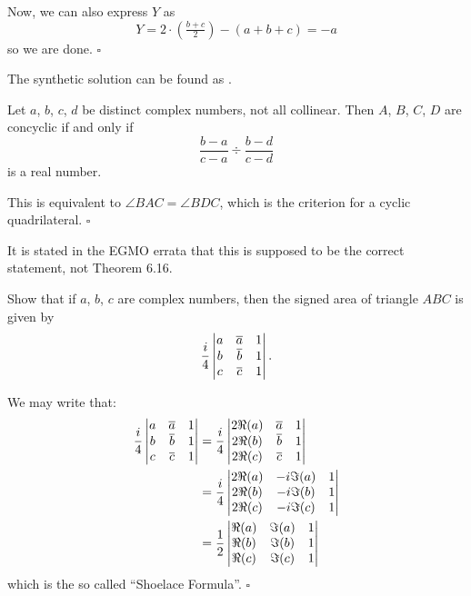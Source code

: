 \documentclass{article}
\begin{document}
Now, we can also express $Y$ as \[Y = 2\cdot(\tfrac{b+c}{2})-(a+b+c) = -a\] so we are done. $\square$
\begin{remark*}
The synthetic solution can be found as .
\end{remark*}

\begin{problem}[6.20]{}
Let $a$, $b$, $c$, $d$ be distinct complex numbers, not all collinear. Then $A$, $B$, $C$, $D$ are concyclic if and only if \[\dfrac{b - a}{c - a} \div \dfrac{b - d}{c - d}\] is a real number.
\end{problem}

This is equivalent to $\angle BAC = \angle BDC$, which is the criterion for a cyclic quadrilateral. $\square$

\begin{remark*}
It is stated in the EGMO errata that this is supposed to be the correct statement, not Theorem 6.16.
\end{remark*}

\begin{problem}[6.21]{}
Show that if $a$, $b$, $c$ are complex numbers, then the signed area of triangle $ABC$ is given by \[\dfrac{i}{4}\begin{vmatrix}a&\overline{a}&1\\b&\overline{b}&1\\c&\overline{c}&1\\\end{vmatrix}.\]
\end{problem}
We may write that:
\begin{align*}
\dfrac{i}{4}\begin{vmatrix}a&\overline{a}&1\\b&\overline{b}&1\\c&\overline{c}&1\\\end{vmatrix} &= \dfrac{i}{4}\begin{vmatrix}2\Re(a)&\overline{a}&1\\2\Re(b)&\overline{b}&1\\2\Re(c)&\overline{c}&1\\\end{vmatrix} \\
&= \dfrac{i}{4}\begin{vmatrix}2\Re(a)&-i\Im(a)&1\\2\Re(b)&-i\Im(b)&1\\2\Re(c)&-i\Im(c)&1\\\end{vmatrix} \\
&= \dfrac{1}{2}\begin{vmatrix}\Re(a)&\Im(a)&1\\\Re(b)&\Im(b)&1\\\Re(c)&\Im(c)&1\\\end{vmatrix}
\end{align*}
which is the so called ``Shoelace Formula''. $\square$
\end{document}
